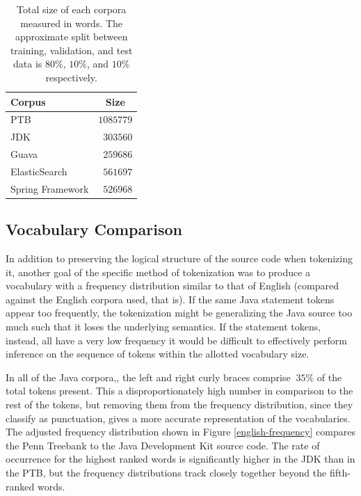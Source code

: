 \documentclass{article}
\begin{document}

\begin{table}[t]
    \caption{Total size of each corpora measured in words. The approximate
    split between training, validation, and test data is $80\%$, $10\%$,
    and $10\%$ respectively.}
    \label{size-table}
    \vskip 0.15in
    \begin{center}
    \begin{tabular}{lr}
    \hline
    Corpus & \multicolumn{1}{c}{Size} \\
    \hline
    \abovespace
    PTB                 & $1085779$ \\
    JDK                 & $303560$ \\
    Guava               & $259686$ \\
    ElasticSearch       & $561697$ \\
    \belowspace
    Spring Framework    & $526968$ \\
    \hline
    \end{tabular}
    \end{center}
    \vskip -0.1in
\end{table}


\subsection{Vocabulary Comparison}

In addition to preserving the logical structure of the source code when
tokenizing it, another goal of the specific method of tokenization was to
produce a vocabulary with a frequency distribution similar to that of
English (compared against the English corpora used, that is). If the same
Java statement tokens appear too frequently, the tokenization might be
generalizing the Java source too much such that it loses the underlying
semantics. If the statement tokens, instead, all have a very low frequency
it would be difficult to effectively perform inference on the sequence of 
tokens within the allotted vocabulary size.

In all of the Java corpora,, the left and right curly braces comprise $~35\%$
of the total tokens present. This a disproportionately high number in
comparison to the rest of the tokens, but removing them from the frequency
distribution, since they classify as punctuation, gives a more accurate
representation of the vocabularies. The adjusted frequency distribution
shown in Figure \ref{english-frequency} compares the Penn Treebank to the
Java Development Kit source code. The rate of occurrence for the highest
ranked words is significantly higher in the JDK than in the PTB, but
the frequency distributions track closely together beyond the fifth-ranked
words. 
\end{document}
